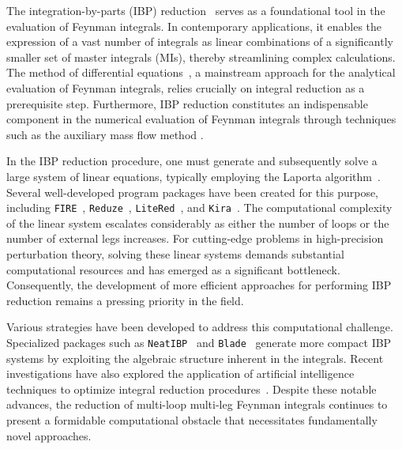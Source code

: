 \documentclass[reprint,superscriptaddress]{revtex4-2}
\begin{document}
The integration-by-parts (IBP) reduction~\cite{Tkachov:1981wb, Chetyrkin:1981qh} serves as a foundational tool in the evaluation of Feynman integrals. In contemporary applications, it enables the expression of a vast number of integrals as linear combinations of a significantly smaller set of master integrals (MIs), thereby streamlining complex calculations. The method of differential equations~\cite{Kotikov:1990kg, Kotikov:1991pm, Remiddi:1997ny, Gehrmann:1999as}, a mainstream approach for the analytical evaluation of Feynman integrals, relies crucially on integral reduction as a prerequisite step. Furthermore, IBP reduction constitutes an indispensable component in the numerical evaluation of Feynman integrals through techniques such as the auxiliary mass flow method \cite{Liu:2022chg}.

In the IBP reduction procedure, one must generate and subsequently solve a large system of linear equations, typically employing the Laporta algorithm~\cite{Laporta:2000dc, Laporta:2000dsw}. Several well-developed program packages have been created for this purpose, including \texttt{FIRE}~\cite{Smirnov:2023yhb}, \texttt{Reduze}~\cite{vonManteuffel:2012np}, \texttt{LiteRed}~\cite{Lee:2013mka}, and \texttt{Kira}~\cite{Klappert:2020nbg,Lange:2025fba}. The computational complexity of the linear system escalates considerably as either the number of loops or the number of external legs increases. For cutting-edge problems in high-precision perturbation theory, solving these linear systems demands substantial computational resources and has emerged as a significant bottleneck. Consequently, the development of more efficient approaches for performing IBP reduction remains a pressing priority in the field.

Various strategies have been developed to address this computational challenge. Specialized packages such as \texttt{NeatIBP}~\cite{Wu:2023upw} and \texttt{Blade}~\cite{Guan:2024byi} generate more compact IBP systems by exploiting the algebraic structure inherent in the integrals. Recent investigations have also explored the application of artificial intelligence techniques to optimize integral reduction procedures~\cite{Song:2025pwy}. Despite these notable advances, the reduction of multi-loop multi-leg Feynman integrals continues to present a formidable computational obstacle that necessitates fundamentally novel approaches.
\end{document}
